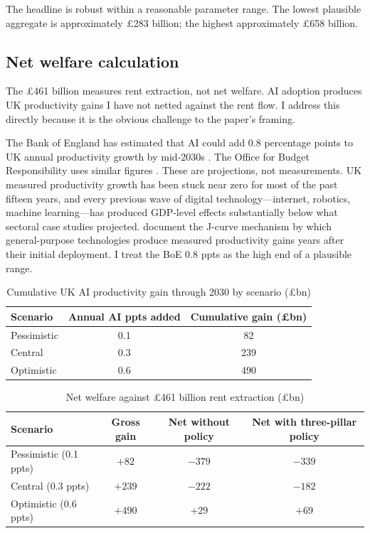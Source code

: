 \documentclass[11pt,letterpaper]{article}
\theoremstyle{remark}
\begin{document}
The headline is robust within a reasonable parameter range. The lowest plausible aggregate is approximately \pounds283 billion; the highest approximately \pounds658 billion.

\subsection{Net welfare calculation}

The \pounds461 billion measures rent extraction, not net welfare. {AI} adoption produces {UK} productivity gains I have not netted against the rent flow. I address this directly because it is the obvious challenge to the paper's framing.

The Bank of England has estimated that {AI} could add 0.8 percentage points to {UK} annual productivity growth by mid-2030s \citep{bank_of_england_2025}. The Office for Budget Responsibility uses similar figures \citep{obr_2026}. These are projections, not measurements. {UK} measured productivity growth has been stuck near zero for most of the past fifteen years, and every previous wave of digital technology---internet, robotics, machine learning---has produced {GDP}-level effects substantially below what sectoral case studies projected. \citet{brynjolfsson_rock_syverson_2025} document the J-curve mechanism by which general-purpose technologies produce measured productivity gains years after their initial deployment. I treat the {BoE} 0.8 ppts as the high end of a plausible range.

\begin{table}[h]
\centering
\caption{Cumulative {UK} {AI} productivity gain through 2030 by scenario (\pounds bn)}
\begin{tabular}{lcc}
\toprule
Scenario & Annual {AI} ppts added & Cumulative gain (\pounds bn) \\
\midrule
Pessimistic & 0.1 & 82 \\
Central & 0.3 & 239 \\
Optimistic & 0.6 & 490 \\
\bottomrule
\end{tabular}
\end{table}

\begin{table}[h]
\centering
\caption{Net welfare against \pounds461 billion rent extraction (\pounds bn)}
\begin{tabular}{lccc}
\toprule
Scenario & Gross gain & Net without policy & Net with three-pillar policy \\
\midrule
Pessimistic (0.1 ppts) & $+82$ & $-379$ & $-339$ \\
Central (0.3 ppts) & $+239$ & $-222$ & $-182$ \\
Optimistic (0.6 ppts) & $+490$ & $+29$ & $+69$ \\
\bottomrule
\end{tabular}
\end{table}
\end{document}
